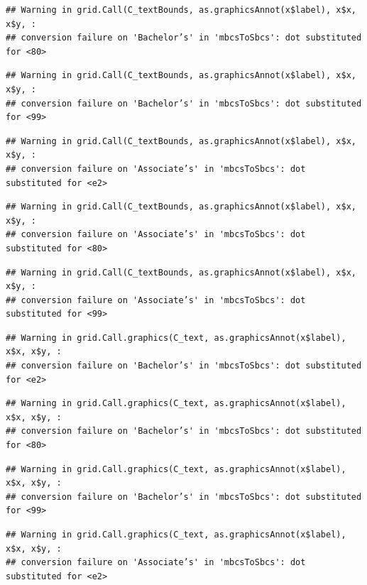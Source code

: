 \documentclass[
]{article}
\begin{document}
\begin{verbatim}
## Warning in grid.Call(C_textBounds, as.graphicsAnnot(x$label), x$x, x$y, :
## conversion failure on 'Bachelor’s' in 'mbcsToSbcs': dot substituted for <80>
\end{verbatim}

\begin{verbatim}
## Warning in grid.Call(C_textBounds, as.graphicsAnnot(x$label), x$x, x$y, :
## conversion failure on 'Bachelor’s' in 'mbcsToSbcs': dot substituted for <99>
\end{verbatim}

\begin{verbatim}
## Warning in grid.Call(C_textBounds, as.graphicsAnnot(x$label), x$x, x$y, :
## conversion failure on 'Associate’s' in 'mbcsToSbcs': dot substituted for <e2>
\end{verbatim}

\begin{verbatim}
## Warning in grid.Call(C_textBounds, as.graphicsAnnot(x$label), x$x, x$y, :
## conversion failure on 'Associate’s' in 'mbcsToSbcs': dot substituted for <80>
\end{verbatim}

\begin{verbatim}
## Warning in grid.Call(C_textBounds, as.graphicsAnnot(x$label), x$x, x$y, :
## conversion failure on 'Associate’s' in 'mbcsToSbcs': dot substituted for <99>
\end{verbatim}

\begin{verbatim}
## Warning in grid.Call.graphics(C_text, as.graphicsAnnot(x$label), x$x, x$y, :
## conversion failure on 'Bachelor’s' in 'mbcsToSbcs': dot substituted for <e2>
\end{verbatim}

\begin{verbatim}
## Warning in grid.Call.graphics(C_text, as.graphicsAnnot(x$label), x$x, x$y, :
## conversion failure on 'Bachelor’s' in 'mbcsToSbcs': dot substituted for <80>
\end{verbatim}

\begin{verbatim}
## Warning in grid.Call.graphics(C_text, as.graphicsAnnot(x$label), x$x, x$y, :
## conversion failure on 'Bachelor’s' in 'mbcsToSbcs': dot substituted for <99>
\end{verbatim}

\begin{verbatim}
## Warning in grid.Call.graphics(C_text, as.graphicsAnnot(x$label), x$x, x$y, :
## conversion failure on 'Associate’s' in 'mbcsToSbcs': dot substituted for <e2>
\end{verbatim}
\end{document}
